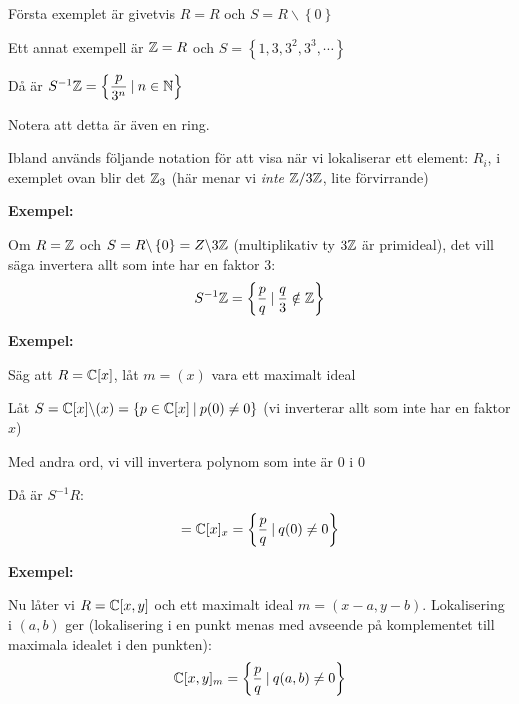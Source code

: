 \noindent Första exemplet är givetvis $R = R$ och $S = R\backslash\left\{0\right\}$
\par\bigskip
\noindent Ett annat exempell är $\mathbb{Z} = R$ och $S = \left\{1,3,3^2,3^3,\cdots\right\}$\par
\noindent Då är $S^{-1}\mathbb{Z} = \left\{\dfrac{p}{3^n}\:|\: n\in\mathbb{N}\right\}$\par
\noindent Notera att detta är även en ring. 
\par\bigskip
\noindent Ibland används följande notation för att visa när vi lokaliserar ett element: $R_i$, i exemplet ovan blir det $\mathbb{Z}_3$ (här menar vi \textit{inte} $\mathbb{Z}/3\mathbb{Z}$, lite förvirrande) 
\par\bigskip
\noindent\textbf{Exempel:}\par
\noindent Om $R=\mathbb{Z}$ och $S = R\backslash\left\{0\right\} = Z\backslash3\mathbb{Z}$ (multiplikativ ty $3\mathbb{Z}$ är primideal), det vill säga invertera allt som inte har en faktor 3:
\begin{equation*}
  \begin{gathered}
    S^{-1}\mathbb{Z} = \left\{\dfrac{p}{q}\:|\: \dfrac{q}{3}\notin\mathbb{Z}\right\}
  \end{gathered}
\end{equation*}
\par\bigskip
\noindent\textbf{Exempel:}\par
\noindent Säg att $R = \mathbb{C}[x]$, låt $m=(x)$ vara ett maximalt ideal\par
\noindent Låt $S = \mathbb{C}[x]\backslash(x) = \left\{p\in\mathbb{C}[x]\:|\: p(0)\neq0\right\}$ (vi inverterar allt som inte har en faktor $x$)\par
\noindent Med andra ord, vi vill invertera polynom som inte är 0 i 0\par
\noindent Då är $S^{-1}R$:
\begin{equation*}
  \begin{gathered}
    = \mathbb{C}[x]_x = \left\{\dfrac{p}{q}\:|\:q(0)\neq0\right\}
  \end{gathered}
\end{equation*}
\par\bigskip
\noindent\textbf{Exempel:}\par
\noindent Nu låter vi $R = \mathbb{C}[x,y]$ och ett maximalt ideal $m = (x-a,y-b)$. Lokalisering i $(a,b)$ ger (lokalisering i en punkt menas med avseende på komplementet till maximala idealet i den punkten):
\begin{equation*}
  \begin{gathered}
    \mathbb{C}[x,y]_m = \left\{\dfrac{p}{q}\:|\: q(a,b)\neq0\right\}
  \end{gathered}
\end{equation*}
